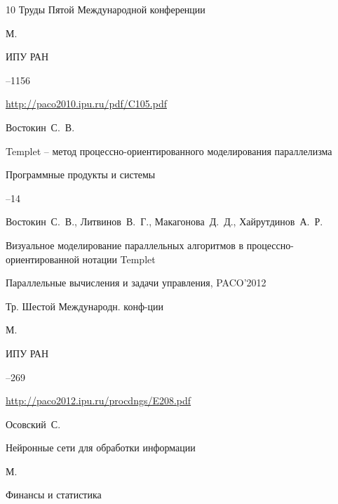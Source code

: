 \begin{thebibliography}{10}
\bookinfo Труды Пятой Международной конференции

\publaddr М.

\publ ИПУ РАН


--1156

\url{http://paco2010.ipu.ru/pdf/C105.pdf}




\by Востокин~С.~В. 

\paper Templet – метод процессно-ориентированного моделирования параллелизма 

\jour Программные продукты и системы



--14








\by Востокин~С.~В., Литвинов~В.~Г., Макагонова~Д.~Д., Хайрутдинов~А.~Р.

\paper Визуальное моделирование параллельных алгоритмов в процессно-ориентированной нотации Templet 

\inbook Параллельные вычисления и задачи управления, \rm PACO’2012

\bookinfo Тр. Шестой Меж\-ду\-народн. конф-ции

\publaddr  М.

\publ ИПУ РАН



--269

\url{http://paco2012.ipu.ru/procdngs/E208.pdf}














\by Осовский~С.

\book Нейронные сети для обработки информации

\publaddr М.

\publ Финансы и статистика






\end{thebibliography}
